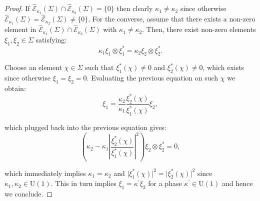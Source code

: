 \documentclass[10pt,a4paper,twoside,reqno]{amsart}
\theoremstyle{plain}
\theoremstyle{definition}
\theoremstyle{remark}
\def\U{\mathrm{U}}
\def\hcE{\widehat{\mathcal{E}}}
\begin{document}
\begin{proof}
If $\hcE_{\kappa_1}(\Sigma)\cap \hcE_{\kappa_2}(\Sigma)=\{0\}$ then clearly $\kappa_1\neq\kappa_2$ since otherwise $\hcE_{\kappa_1}(\Sigma) = \hcE_{\kappa_2}(\Sigma) \neq \{0\}$. For the converse, assume that there exists a non-zero element in $\hcE_{\kappa_1}(\Sigma)\cap \hcE_{\kappa_2}(\Sigma)$ with $\kappa_1\neq\kappa_2$. Then, there exist non-zero elements $\xi_1 , \xi_2 \in \Sigma$ satisfying: 
\begin{equation*}
\kappa_1\xi_1\otimes\xi_1^* = \kappa_2\xi_2\otimes\xi_2^*.
\end{equation*}

\noindent
Choose an element $\chi\in\Sigma$ such that $\xi^{\ast}_1(\chi)\neq 0$ and $\xi^{\ast}_2(\chi)\neq 0$, which exists since otherwise $\xi_1 = \xi_2 = 0$. Evaluating the previous equation on such $\chi$ we obtain:
\begin{equation*}
 \xi_1  = \frac{\kappa_2}{\kappa_1}\frac{\xi_2^{\ast}(\chi)}{\xi_1^{\ast}(\chi)}\xi_2,
\end{equation*}

\noindent
which plugged back into the previous equation gives:
\begin{equation*}
\left(\kappa_2 - \kappa_1 \left\vert\frac{\xi_2^{\ast}(\chi)}{\xi_1^{\ast}(\chi)}\right\vert^2\right)\xi_2\otimes\xi_2^* = 0,
\end{equation*}

\noindent
which immediately implies $\kappa_1 = \kappa_2$ and $\vert \xi_1^{\ast}(\chi) \vert^2 = \vert \xi_2^{\ast}(\chi)\vert^2$ since $\kappa_1,\kappa_2\in\mathrm{U}(1)$. This in turn implies $\xi_1 = \kappa^{\prime} \xi_2$ for a phase $\kappa^{\prime}\in \U(1)$ and hence we conclude.
\end{proof}
\end{document}
